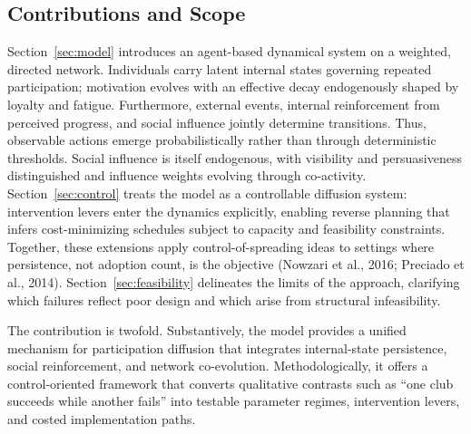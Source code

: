 \documentclass[11pt]{article}
\begin{document}
\subsection{Contributions and Scope}
Section~\ref{sec:model} introduces an agent-based dynamical system on a weighted, directed network. Individuals carry latent internal states governing repeated participation; motivation evolves with an effective decay endogenously shaped by loyalty and fatigue. Furthermore, external events, internal reinforcement from perceived progress, and social influence jointly determine transitions. Thus, observable actions emerge probabilistically rather than through deterministic thresholds. Social influence is itself endogenous, with visibility and persuasiveness distinguished and influence weights evolving through co-activity. Section~\ref{sec:control} treats the model as a controllable diffusion system: intervention levers enter the dynamics explicitly, enabling reverse planning that infers cost-minimizing schedules subject to capacity and feasibility constraints. Together, these extensions apply control-of-spreading ideas to settings where persistence, not adoption count, is the objective (Nowzari et al., 2016; Preciado et al., 2014). Section~\ref{sec:feasibility} delineates the limits of the approach, clarifying which failures reflect poor design and which arise from structural infeasibility.

The contribution is twofold. Substantively, the model provides a unified mechanism for participation diffusion that integrates internal-state persistence, social reinforcement, and network co-evolution. Methodologically, it offers a control-oriented framework that converts qualitative contrasts such as ``one club succeeds while another fails'' into testable parameter regimes, intervention levers, and costed implementation paths.
\end{document}
